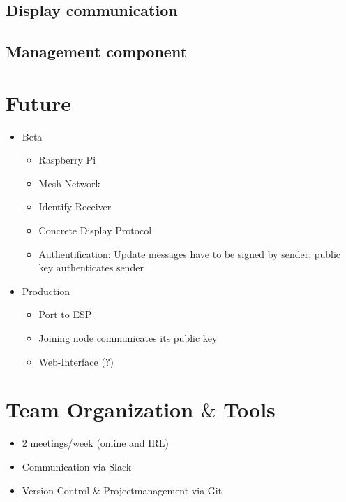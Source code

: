 \documentclass[ucs,9pt]{beamer}
\begin{document}
\subsection{Display communication}
\begin{frame}{\insertsubsection}
\end{frame}

\subsection{Management component}
\begin{frame}{\insertsubsection}
\end{frame}


\section{Future}
\begin{frame}{\insertsection}

\begin{itemize}
    \item Beta
    \begin{itemize}
        \item Raspberry Pi
        \item Mesh Network
        \item Identify Receiver \item Concrete Display Protocol
        \item Authentification: Update messages have to be signed by sender; public key authenticates sender
    \end{itemize}
    \item Production
    \begin{itemize}
        \item Port to ESP
        \item Joining node communicates its public key
        \item Web-Interface (?)
    \end{itemize}
\end{itemize}
\end{frame}



\section{Team Organization $\&$ Tools}
\begin{frame}{\insertsection}
\begin{itemize}
    \item 2 meetings/week (online and IRL)
    \item Communication via Slack
    \item Version Control & Projectmanagement via Git

\end{itemize}

\end{frame}
\end{document}
